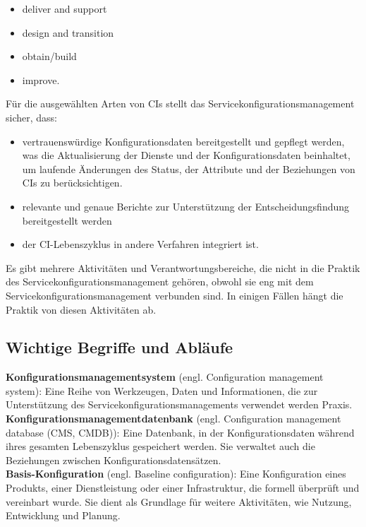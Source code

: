 \begin{itemize}
	\item deliver and support
	\item design and transition
	\item obtain/build
	\item improve.
\end{itemize}

\noindent
Für die ausgewählten Arten von CIs stellt das Servicekonfigurationsmanagement sicher, dass:

\begin{itemize}
	\item vertrauenswürdige Konfigurationsdaten bereitgestellt und gepflegt werden, was die Aktualisierung der Dienste und der Konfigurationsdaten beinhaltet, 
	um laufende Änderungen des Status, der Attribute und der Beziehungen von CIs zu berücksichtigen.
	\item relevante und genaue Berichte zur Unterstützung der Entscheidungsfindung bereitgestellt werden
	\item der CI-Lebenszyklus in andere Verfahren integriert ist.
\end{itemize}

\noindent
Es gibt mehrere Aktivitäten und Verantwortungsbereiche, die nicht in die Praktik 
des Servicekonfigurationsmanagement gehören, obwohl sie eng mit dem Servicekonfigurationsmanagement verbunden sind.
In einigen Fällen hängt die Praktik von diesen Aktivitäten ab. 

\subsection{Wichtige Begriffe und Abläufe}
\textbf{Konfigurationsmanagementsystem} (engl. Configuration management system):
Eine Reihe von Werkzeugen, Daten und Informationen, die zur Unterstützung des Servicekonfigurationsmanagements verwendet werden
Praxis. \\

\noindent
\textbf{Konfigurationsmanagementdatenbank} (engl. Configuration management database
(CMS, CMDB)):
Eine Datenbank, in der Konfigurationsdaten während ihres gesamten Lebenszyklus gespeichert werden. Sie verwaltet auch die
Beziehungen zwischen Konfigurationsdatensätzen. \\

\noindent
\textbf{Basis-Konfiguration} 
(engl. Baseline configuration):
Eine Konfiguration eines Produkts, einer Dienstleistung oder einer Infrastruktur, die formell überprüft und
vereinbart wurde. Sie dient als Grundlage für weitere Aktivitäten, wie Nutzung, Entwicklung und Planung. \\

